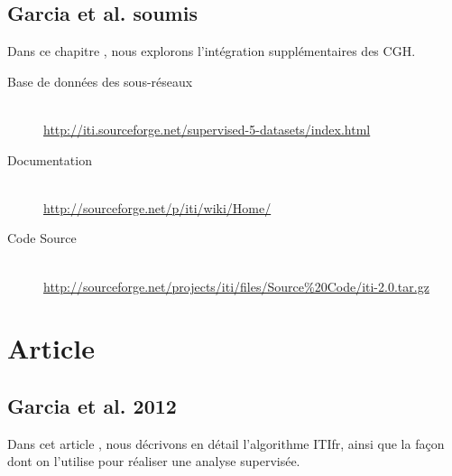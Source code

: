         

      \subsection*{\textcolor{white!15!black}{Garcia et al. soumis}}\label{app:Garcia2013b}
        Dans ce chapitre \citep{Garcia2013b}, nous explorons l'intégration supplémentaires des CGH.

        \begin{description}
          \item [Base de données des sous-réseaux]    \hfill \\
            \url{http://iti.sourceforge.net/supervised-5-datasets/index.html}
          \item [Documentation]                       \hfill \\
            \url{http://sourceforge.net/p/iti/wiki/Home/}
          \item [Code Source]                         \hfill \\
            \url{http://sourceforge.net/projects/iti/files/Source%20Code/iti-2.0.tar.gz}
        \end{description}

        

  \section*{\textcolor{white!15!black}{Article}}
    \subsection*{\textcolor{white!15!black}{Garcia et al. 2012}}\label{app:Garcia2012}
      Dans cet article \citep{Garcia2012}, nous décrivons en détail l'algorithme \acs{ITIfr}, ainsi que la façon dont on l'utilise pour réaliser une analyse supervisée.

